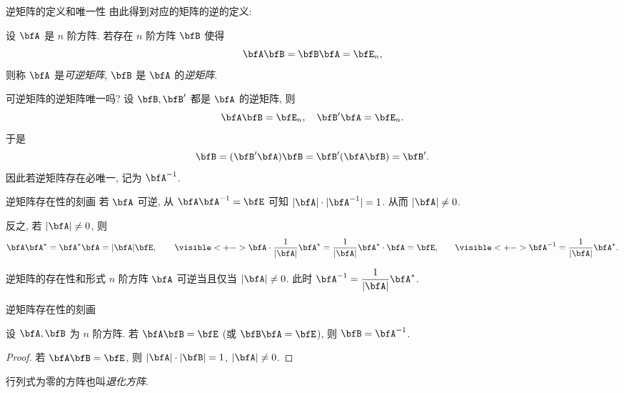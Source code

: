 \begin{frame}{逆矩阵的定义和唯一性}
	\onslide<+->
	由此得到对应的矩阵的逆的定义:
	\onslide<+->
	\begin{definition}
		设 $\bfA$ 是 $n$ 阶方阵. 若存在 $n$ 阶方阵 $\bfB$ 使得
		\[\bfA\bfB=\bfB\bfA=\bfE_n,\]
		则称 $\bfA$ 是\emph{可逆矩阵}, $\bfB$ 是 $\bfA$ 的\emph{逆矩阵}.
	\end{definition}
	\onslide<+->
	可逆矩阵的逆矩阵唯一吗?
	\onslide<+->
	设 $\bfB,\bfB'$ 都是 $\bfA$ 的逆矩阵, 则
	\[\bfA\bfB=\bfE_n,\quad \bfB'\bfA=\bfE_n.\]
	\onslide<+->
	于是
	\[\bfB=(\bfB'\bfA)\bfB=\bfB'(\bfA\bfB)=\bfB'.\]
	\onslide<+->
	因此\alert{若逆矩阵存在必唯一, 记为 $\bfA^{-1}$}.
\end{frame}


\begin{frame}{逆矩阵存在性的刻画}
	\onslide<+->
	若 $\bfA$ 可逆, 从 $\bfA\bfA^{-1}=\bfE$ 可知 $|\bfA|\cdot|\bfA^{-1}|=1$.
	\onslide<+->
	从而 $|\bfA|\neq 0$.

	\onslide<+->
	反之, 若 $|\bfA|\neq0$, 则
	\[\bfA\bfA^*=\bfA^*\bfA=|\bfA|\bfE,\qquad
	\visible<+->{\bfA\cdot\frac1{|\bfA|}\bfA^*=\frac1{|\bfA|}\bfA^*\cdot\bfA=\bfE,}\qquad
	\visible<+->{\bfA^{-1}=\frac1{|\bfA|}\bfA^*.}\]
	\vspace{-.5\baselineskip}
	\onslide<+->
	\begin{second}{逆矩阵的存在性和形式}
		$n$ 阶方阵 $\bfA$ 可逆当且仅当 $|\bfA|\neq 0$.
		此时 $\bfA^{-1}=\dfrac1{|\bfA|}\bfA^*$.
	\end{second}
\end{frame}


\begin{frame}{逆矩阵存在性的刻画}
	\onslide<+->
	\begin{corollary}
		设 $\bfA,\bfB$ 为 $n$ 阶方阵.
		若 $\bfA\bfB=\bfE$ (或 $\bfB\bfA=\bfE$), 则 $\bfB=\bfA^{-1}$.
	\end{corollary}
	\onslide<+->
	\begin{proof}
		若 $\bfA\bfB=\bfE$, 则 $|\bfA|\cdot|\bfB|=1$, $|\bfA|\neq0$.
		\onslide<+->{%
			\[\bfA^{-1}=\bfA^{-1}(\bfA\bfB)=\bfB.\qedhere\]
		}\vspace{-\baselineskip}
	\end{proof}

	\onslide<+->
	行列式为零的方阵也叫\emph{退化方阵}. 
\end{frame}


